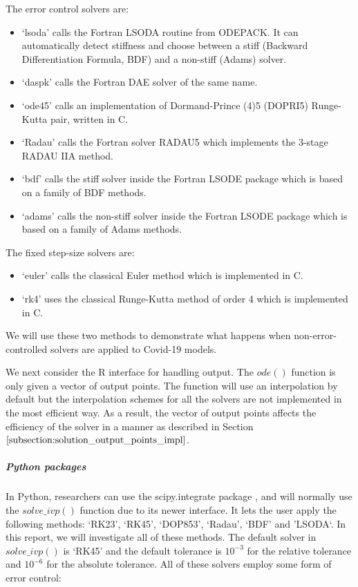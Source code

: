 The error control solvers are:
\begin{itemize}
\item `lsoda' calls the Fortran LSODA routine from ODEPACK. It can automatically detect stiffness and choose between a stiff (Backward Differentiation Formula, BDF) and a non-stiff (Adams) solver.

\item `daspk' calls the Fortran DAE solver of the same name.

\item `ode45' calls an implementation of Dormand-Prince (4)5 (DOPRI5) Runge-Kutta pair, written in C.

\item `Radau' calls the Fortran solver RADAU5 which implements the 3-stage RADAU IIA method.

\item `bdf' calls the stiff solver inside the Fortran LSODE package which is based on a family of BDF methods.

\item `adams' calls the non-stiff solver inside the Fortran LSODE package which is based on a family of Adams methods.
\end{itemize}

The fixed step-size solvers are:
\begin{itemize}
\item `euler' calls the classical Euler method which is implemented in C.
\item `rk4' uses the classical Runge-Kutta method of order 4 which is implemented in C. 
\end{itemize}

We will use these two methods to demonstrate what happens when non-error-controlled solvers are applied to Covid-19 models.

We next consider the R interface for handling output. The $ode()$ function is only given a vector of output points.  The function will use an interpolation by default but the interpolation schemes for all the solvers are not implemented in the most efficient way. As a result, the vector of output points affects the efficiency of the solver in a manner as described in Section $\ref{subsection:solution_output_points_impl}$.

\subparagraph{Python packages}
In Python, researchers can use the scipy.integrate package \cite{2020SciPy-NMeth}, and will normally use the $solve\_ivp()$ function due to its newer interface. It lets the user apply the following methods: `RK23', `RK45', `DOP853', `Radau', `BDF' and 'LSODA`. In this report, we will investigate all of these methods. The default solver in $solve\_ivp()$ is `RK45' and the default tolerance is $10^{-3}$ for the relative tolerance and $10^{-6}$ for the absolute tolerance. All of these solvers employ some form of error control:

